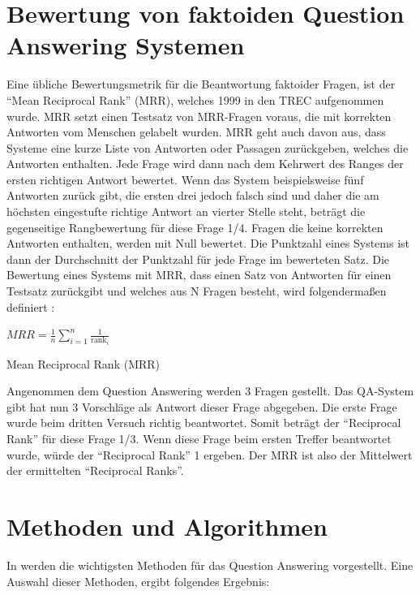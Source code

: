 \documentclass[
        ngerman,
        paper=a4,
        numbers=noendperiod,
]{scrreprt}
\begin{document}
\section{Bewertung von faktoiden Question Answering Systemen}

Eine übliche Bewertungsmetrik für die Beantwortung faktoider Fragen, ist der \enquote{Mean Reciprocal Rank} (MRR), welches 1999 in den TREC \citep{voorhees1999proceedings} aufgenommen wurde. MRR setzt einen Testsatz von MRR-Fragen voraus, die mit korrekten Antworten vom Menschen gelabelt wurden. MRR geht auch davon aus, dass Systeme eine kurze Liste von Antworten oder Passagen zurückgeben, welches die Antworten enthalten. Jede Frage wird dann nach dem Kehrwert des Ranges der ersten richtigen Antwort bewertet. Wenn das System beispielsweise fünf Antworten zurück gibt, die ersten drei jedoch falsch sind und daher die am höchsten eingestufte richtige Antwort an vierter Stelle steht, beträgt die gegenseitige Rangbewertung für diese Frage 1/4. Fragen die keine korrekten Antworten enthalten, werden mit Null bewertet. Die Punktzahl eines Systems ist dann der Durchschnitt der Punktzahl für jede Frage im bewerteten Satz. Die Bewertung eines Systems mit MRR, dass einen Satz von Antworten für einen Testsatz zurückgibt und welches aus N Fragen besteht, wird folgendermaßen definiert \citep [S. 483]{Jurafsky2014SpeechProcessing}:

\begin{xequation-} 
\centering ${MRR}= \frac{1}{n} \sum_{i=1}^{n} \frac{1}{\text{rank}_i}$
\caption[Mean Reciprocal Rank (MRR)]{Mean Reciprocal Rank (MRR)} 
    \label{eqn:MRR}
\end{xequation-} 

Angenommen dem Question Answering werden 3 Fragen gestellt. Das QA-System gibt hat nun 3 Vorschläge als Antwort dieser Frage abgegeben. Die erste Frage wurde beim dritten Versuch richtig beantwortet. Somit beträgt der \enquote{Reciprocal Rank} für diese Frage 1/3. Wenn diese Frage beim ersten Treffer beantwortet wurde, würde der \enquote{Reciprocal Rank} 1 ergeben. Der MRR ist also der Mittelwert der ermittelten \enquote{Reciprocal Ranks}.





\section{Methoden und Algorithmen}
In \citep [S. 5418 - 5427]{Kolomiyets2011APerspective} werden die wichtigsten Methoden für das Question Answering vorgestellt. Eine Auswahl dieser Methoden, ergibt folgendes Ergebnis:
\end{document}
